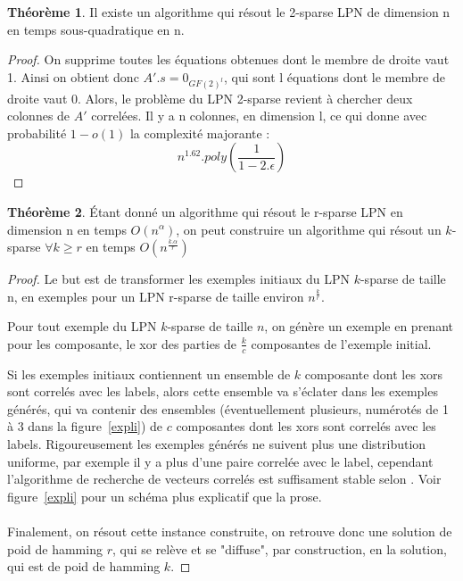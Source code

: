 \documentclass{article}		%
\theoremstyle{definition}
\newtheorem{theo}{Théorème}
\theoremstyle{plain}
\theoremstyle{plain}
\theoremstyle{plain}
\theoremstyle{plain}
\begin{document}
\begin{theo}
Il existe un algorithme qui résout le 2-sparse LPN de dimension n en temps
sous-quadratique en n. 
\end{theo}

\begin{proof}
On supprime toutes les équations obtenues dont le membre de droite vaut
1. Ainsi on obtient donc $A'.s=0_{GF(2)^l}$, qui sont l équations dont le
membre de droite vaut 0. Alors, le problème du LPN 2-sparse revient à
chercher deux colonnes de $A'$ correlées. Il y a n colonnes, en dimension
l, ce qui donne avec probabilité $1-o(1)$ la complexité majorante : 
$$n^{1.62}.poly(\frac{1}{1-2.\epsilon}) $$ 
\end{proof}

\begin{framed}

\begin{theo}\label{reductionvaliant}
Étant donné un algorithme qui résout le r-sparse LPN en dimension n en temps
$O(n^\alpha)$, on peut construire  un algorithme qui résout un
$k$-sparse $\forall k \geq r$ en temps $O(n^{\frac{k.\alpha}{r}})$
\end{theo}

\begin{proof}
Le but est de transformer les exemples initiaux du LPN $k$-sparse de taille n, en
exemples pour un LPN r-sparse de taille environ $n^{\frac{k}{r}}$.

Pour tout exemple du LPN $k$-sparse de taille $n$, on génère un exemple
en prenant pour les composante, le xor des parties de
$\frac{k}{c}$ composantes de l'exemple initial.

Si les exemples initiaux contiennent un ensemble de $k$ composante dont
les xors sont
correlés avec les labels, alors cette ensemble va s'éclater dans les
exemples générés, qui va contenir des
ensembles (éventuellement plusieurs, numérotés de 1 à 3 dans la
figure~\ref{expli}) de $c$ composantes dont les xors sont correlés avec les labels. 
Rigoureusement les exemples générés ne suivent plus une distribution
uniforme, par exemple il y a plus d'une paire correlée avec le label, cependant l'algorithme de recherche de vecteurs correlés est
suffisament stable selon \cite{Valiant}. Voir figure~\ref{expli} pour un schéma plus explicatif
que la prose.
\\\\
Finalement, on résout cette instance construite, on retrouve donc une
solution de poid de hamming $r$, qui se relève et se "diffuse", par
construction, en la solution, qui est de poid de hamming $k$. 

\end{proof}
\end{framed}
\end{document}
